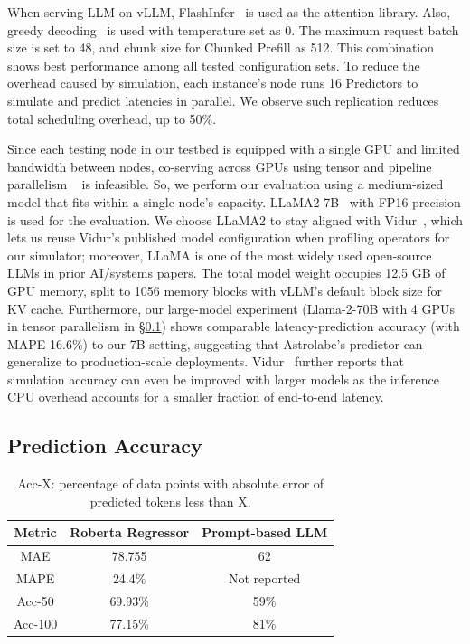 \documentclass[sigconf, review, anonymous]{acmart}
\begin{document}
When serving LLM on vLLM, FlashInfer~\cite{ye2025flashinfer} is used as the attention library. Also, greedy decoding~\cite{jm3} is used with temperature set as 0. The maximum request batch size is set to 48, and chunk size for Chunked Prefill as 512. This combination shows best performance among all tested configuration sets. To reduce the overhead caused by simulation, each instance's node runs 16 Predictors to simulate and predict latencies in parallel. We observe such replication reduces total scheduling overhead, up to 50\%.

Since each testing node in our testbed is equipped with a single GPU and limited bandwidth between nodes, co-serving across GPUs using tensor and pipeline parallelism ~\cite{narayanan2021efficientlargescalelanguagemodel} is infeasible. So, we perform our evaluation using a medium-sized model that fits within a single node's capacity. LLaMA2-7B~\cite{llama} with FP16 precision is used for the evaluation. We choose LLaMA2 to stay aligned with Vidur~\cite{vidur}, which lets us reuse Vidur's published model configuration when profiling operators for our simulator; moreover, LLaMA is one of the most widely used open-source LLMs in prior AI/systems papers.
The total model weight occupies 12.5 GB of GPU memory, split to 1056 memory blocks with vLLM's default block size for KV cache. Furthermore, our large-model experiment (Llama-2-70B with 4 GPUs in tensor parallelism in \S\ref{section:predicting accuracy}) shows comparable latency-prediction accuracy (with MAPE 16.6\%) to our 7B setting, suggesting that Astrolabe's predictor can generalize to production-scale deployments. Vidur~\cite{vidur} further reports that simulation accuracy can even be improved with larger models as the inference CPU overhead accounts for a smaller fraction of end-to-end latency.

\subsection{Prediction Accuracy} \label{section:predicting accuracy}

\begin{table}[tb]
    \caption{Response Length Prediction}
    \centering
    \begin{tabular}{ccc}
    \toprule
    Metric & Roberta Regressor & Prompt-based LLM  \\ \midrule
    MAE & 78.755 & 62 \\
    MAPE & 24.4\% & Not reported \\
    Acc-50 & 69.93\% & 59\% \\
    Acc-100 & 77.15\% & 81\% \\ 
    \bottomrule
    \end{tabular}
    \caption*{Acc-X: percentage of data points with absolute error of predicted tokens less than X.}
    \label{table:length_prediction}
\end{table}%
\end{document}
